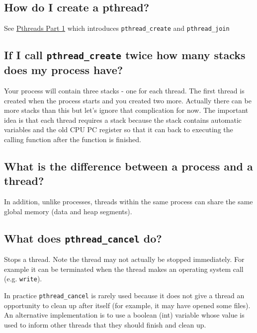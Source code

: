 \subsection{How do I create a pthread?}\label{how-do-i-create-a-pthread}

See
\href{https://github.com/angrave/SystemProgramming/wiki/Pthreads,-Part-1:-Introduction}{Pthreads
Part 1} which introduces \texttt{pthread\_create} and
\texttt{pthread\_join}

\subsection{\texorpdfstring{If I call \texttt{pthread\_create} twice how
many stacks does my process
have?}{If I call pthread\_create twice how many stacks does my process have?}}\label{if-i-call-pthreadux5fcreate-twice-how-many-stacks-does-my-process-have}

Your process will contain three stacks - one for each thread. The first
thread is created when the process starts and you created two more.
Actually there can be more stacks than this but let's ignore that
complication for now. The important idea is that each thread requires a
stack because the stack contains automatic variables and the old CPU PC
register so that it can back to executing the calling function after the
function is finished.

\subsection{What is the difference between a process and a
thread?}\label{what-is-the-difference-between-a-process-and-a-thread}

In addition, unlike processes, threads within the same process can share
the same global memory (data and heap segments).

\subsection{\texorpdfstring{What does \texttt{pthread\_cancel}
do?}{What does pthread\_cancel do?}}\label{what-does-pthreadux5fcancel-do}

Stops a thread. Note the thread may not actually be stopped immediately.
For example it can be terminated when the thread makes an operating
system call (e.g. \texttt{write}).

In practice \texttt{pthread\_cancel} is rarely used because it does not
give a thread an opportunity to clean up after itself (for example, it
may have opened some files).\\An alternative implementation is to use a
boolean (int) variable whose value is used to inform other threads that
they should finish and clean up.

